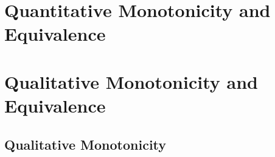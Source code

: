 
\section{Quantitative Monotonicity and Equivalence}


\section{Qualitative Monotonicity and Equivalence}
\subsection{Qualitative Monotonicity}
    \label{sec:monotone}


